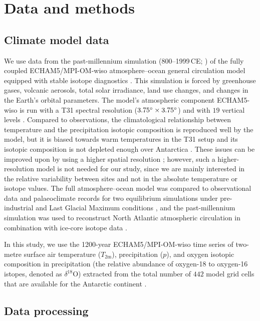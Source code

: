 \documentclass[cp, manuscript]{copernicus}
\begin{document}
\section{Data and methods}\label{methods}

\subsection{Climate model data}\label{methods:data}

We use data from the past-millennium simulation
(800--1999\,CE; \citealp{Sjolte2018}) of the fully coupled ECHAM5/MPI-OM-wiso
atmosphere--ocean general circulation model equipped with stable isotope
diagnostics \citep{Werner2016}. This simulation is forced by greenhouse gases,
volcanic aerosols, total solar irradiance, land use changes, and changes in the
Earth's orbital parameters. The model's atmospheric component ECHAM5-wiso is run
with a T31 spectral resolution ($3.75^{\circ}\times3.75^{\circ}$) and
with $19$ vertical levels \citep{Sjolte2018}. Compared to observations, the
climatological relationship between temperature and the precipitation isotopic
composition is reproduced well by the model, but it is biased towards warm
temperatures in the T31 setup and its isotopic composition is not depleted
enough over Antarctica \citep{Werner2011}. These issues can be improved upon by
using a higher spatial resolution \citep{Werner2011}; however, such a
higher-resolution model is not needed for our study, since we are mainly
interested in the relative variability between sites and not in the absolute
temperature or isotope values. The full atmosphere--ocean model was compared to
observational data and palaeoclimate records for two equilibrium simulations
under pre-industrial and Last Glacial Maximum conditions \citep{Werner2016}, and
the past-millennium simulation was used to reconstruct North Atlantic
atmospheric circulation in combination with ice-core isotope data
\citep{Sjolte2018}.

In this study, we use the 1200-year ECHAM5/MPI-OM-wiso time series of two-metre
surface air temperature ($T_{2\mathrm{m}}$), precipitation ($p$), and oxygen
isotopic composition in precipitation (the relative abundance of oxygen-18 to
oxygen-16 istopes, denoted as $\delta^{18}\mathrm{O}$) extracted from the total
number of $442$ model grid cells that are available for the Antarctic continent
\citep{Munch2020}.

\subsection{Data processing}\label{methods:prc}
\end{document}
